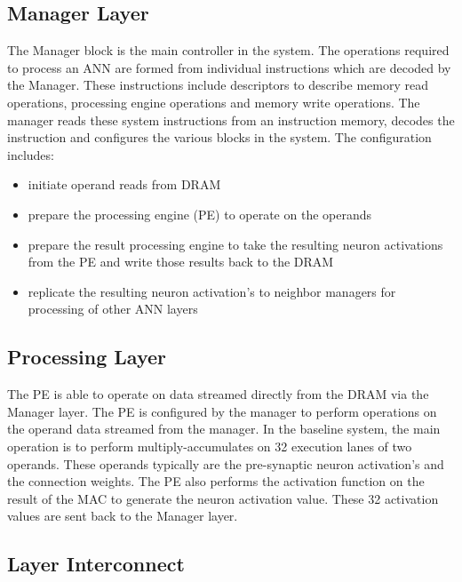 \documentclass[journal]{IEEEtran}
\begin{document}
\subsection{Manager Layer}
The Manager block is the main controller in the system. The operations required to process an ANN are formed from individual instructions which are decoded by the Manager. 
These instructions include descriptors to describe memory read operations, processing engine operations and memory write operations. The manager reads these system instructions from an instruction memory, decodes the instruction and configures the various blocks in the system.
The configuration includes:
\begin{itemize}

      \item initiate operand reads from DRAM
      \item prepare the processing engine (PE) to operate on the operands
      \item prepare the result processing engine to take the resulting neuron activations from the PE and write those results back to the DRAM
      \item replicate the resulting neuron activation's to neighbor managers for processing of other ANN layers

\end{itemize}

\subsection{Processing Layer}
\label{ssec:Processing Layer}
The PE is able to operate on data streamed directly from the DRAM via the Manager layer. The PE is configured by the manager to perform operations on the operand data streamed from the manager. In the baseline system, the main operation is to perform multiply-accumulates on 32 execution lanes of two operands. These operands typically are the pre-synaptic neuron activation's and the connection weights. The PE also performs the activation function on the result of the MAC to generate the neuron activation value. These 32 activation values are sent back to the Manager layer.

\subsection{Layer Interconnect}
\label{ssec:Layer Interconnect}
\end{document}
